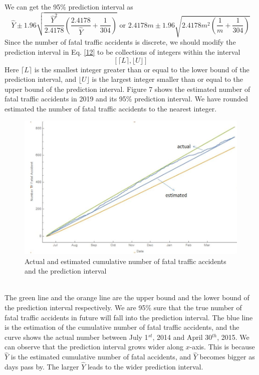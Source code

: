 \documentclass[a4paper,12pt]{article}
\begin{document}
We can get the 95\% prediction interval as
\begin{equation}\label{12}
\widehat{Y}\pm 1.96\sqrt{\frac{\widehat{Y}^2}{2.4178}(\frac{2.4178}{\widehat{Y}}+\frac{1}{304})} \text{ or } 2.4178m\pm 1.96\sqrt{2.4178m^2(\frac{1}{m}+\frac{1}{304})}
\end{equation}
Since the number of fatal traffic accidents is discrete, we should modify the prediction interval in Eq. \eqref{12} to be collections of integers within the interval
\begin{equation}\label{13}
\left[ \lceil L \rceil, \lfloor U \rfloor\right]
\end{equation}
Here $\lceil L \rceil$ is the smallest integer greater than or equal to the lower bound of the prediction interval, and $\lfloor U \rfloor$ is the largest integer smaller than or equal to the upper bound of the prediction interval. Figure 7 shows the estimated number of fatal traffic accidents in 2019 and its 95\% prediction interval. We have rounded estimated the number of fatal traffic accidents to the nearest integer. \\
\begin{figure}[!htbp]
\centering
\includegraphics[width=12 cm]{1.jpg}
\caption{Actual and estimated cumulative number of fatal traffic accidents and the prediction interval}
\end{figure}\\
\newpage
\noindent The green line and the orange line are the upper bound and the lower bound of the prediction interval respectively. We are 95\% sure that the true number of fatal traffic accidents in future will fall into the prediction interval. The blue line is the estimation of the cumulative number of fatal traffic accidents, and the curve shows the actual number between July 1$^{st}$, 2014 and April 30$^{th}$, 2015. We can observe that the prediction interval grows wider along $x$-axis. This is because $\widehat{Y}$ is the estimated cumulative number of fatal accidents, and $\widehat{Y}$ becomes bigger as days pass by. The larger $\widehat{Y}$ leads to the wider prediction interval.
\end{document}
